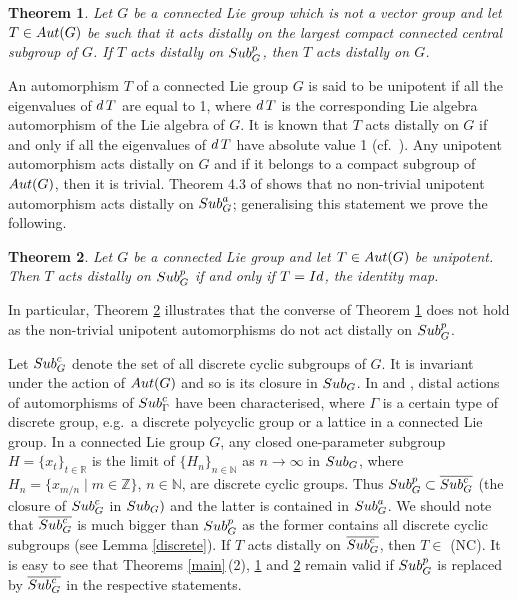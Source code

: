 \documentclass{amsart}
\numberwithin{equation}{section}
\newcommand{\Aut}{{\rm Aut}}
\newcommand{\Sub}{{\rm Sub}}
\newcommand{\N}{{\mathbb N}}
\newcommand{\Z}{{\mathbb Z}}
\newcommand{\R}{{\mathbb R}}
\newcommand{\spg}{{\rm Sub}^p_G}
\newcommand{\du}{{\rm d\,}}
\newcommand{\Id}{{\rm Id}}
\let\ol=\overline
\newtheorem{thm}{Theorem}[section]
\theoremstyle{remark}
\begin{document}
\begin{thm} \label{distal-g}
Let $G$ be a connected Lie group which is not a vector group and let $T\in\Aut(G)$ 
be such that it acts distally on the largest compact connected central subgroup of $G$. 
If $T$ acts distally on $\spg$, then $T$ acts distally on $G$. 
\end{thm}

An automorphism $T$ of a connected Lie group $G$ is said to be unipotent if 
all the eigenvalues of $\du T$ are equal to 1, where $\du T$ is the corresponding 
Lie algebra automorphism of the Lie algebra of $G$. 
It is known that $T$ acts distally on $G$ if and only if all the eigenvalues of $\du T$ have absolute value 1 
 (cf.\ \cite{Ab1}). Any unipotent automorphism acts distally on $G$ and if it belongs to a compact subgroup 
 of $\Aut(G)$, then it is trivial. Theorem 4.3 of \cite{SY3} shows that no non-trivial unipotent automorphism 
 acts distally on $\Sub^a_G$; generalising this statement we prove the following.
 
\begin{thm} \label{unip} Let $G$ be a connected Lie group and let $T\in\Aut(G)$ be unipotent. 
Then $T$ acts distally on $\spg$ if and only if $T=\Id$, the identity map. 
\end{thm}

In particular, Theorem \ref{unip} illustrates that the converse of Theorem \ref{distal-g} does not 
hold as the non-trivial unipotent automorphisms do not act distally on $\spg$.

Let $\Sub^c_G$ denote the set of all discrete cyclic subgroups of $G$. It is invariant under 
the action of $\Aut(G)$ and so is its closure in $\Sub_G$. In \cite{PaS} and \cite{PaPrS}, distal 
actions of automorphisms of  $\Sub^c_\Gamma$ have been characterised, where $\Gamma$ is 
a certain type of discrete group, e.g.\ a discrete polycyclic group or a lattice in a connected Lie group. 
In a connected Lie group $G$, any closed one-parameter subgroup $H=\{x_t\}_{t\in\R}$ is the limit of 
$\{H_n\}_{n\in\N}$ as $n\to\infty$ in $\Sub_G$, where $H_n=\{x_{m/n}\mid m\in\Z\}$, $n\in\N$, are 
discrete cyclic groups. 
Thus $\spg\subset \ol{\Sub^c_G}$ (the closure of $\Sub^c_G$ in $\Sub_G)$ and the latter is contained 
in $\Sub^a_G$. We should note that $\ol{\Sub^c_G}$ is much bigger than $\spg$ as the former contains 
all discrete cyclic subgroups (see Lemma \ref{discrete}). If $T$ acts distally on $\ol{\Sub^c_G}$, then $T\in$ (NC). 
It is easy to see that Theorems \ref{main}\,(2), \ref{distal-g} and \ref{unip} remain valid if $\spg$ is 
replaced by $\ol{\Sub^c_G}$ in the respective statements.
\end{document}
